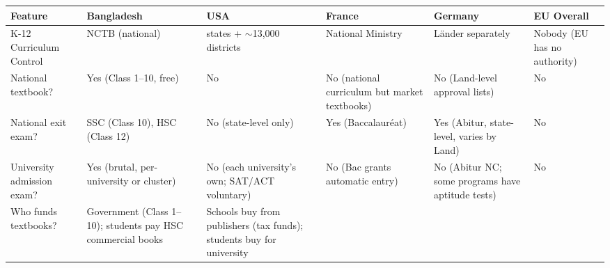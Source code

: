 \begin{center}\footnotesize
	\begin{tabularx}{\textwidth}{@{} >{\raggedright\arraybackslash}p{2.6cm}
		>{\raggedright\arraybackslash}X
		>{\raggedright\arraybackslash}X
		>{\raggedright\arraybackslash}X
		>{\raggedright\arraybackslash}X
		>{\raggedright\arraybackslash}X @{}}
		\toprule
		\textbf{Feature} & \textbf{Bangladesh}                                                      & \textbf{USA} & \textbf{France} & \textbf{Germany} & \textbf{EU Overall} \\
		\midrule
		K-12 Curriculum Control
		                 & NCTB (national)
		                 & 50 states + $\sim$13,000 districts
		                 & National Ministry
		                 & 16 Länder separately
		                 & Nobody (EU has no authority)                                                                                                                       \\
		\addlinespace
		National textbook?
		                 & Yes (Class 1--10, free)
		                 & No
		                 & No (national curriculum but market textbooks)
		                 & No (Land-level approval lists)
		                 & No                                                                                                                                                 \\
		\addlinespace
		National exit exam?
		                 & SSC (Class 10), HSC (Class 12)
		                 & No (state-level only)
		                 & Yes (Baccalauréat)
		                 & Yes (Abitur, state-level, varies by Land)
		                 & No                                                                                                                                                 \\
		\addlinespace
		University admission exam?
		                 & Yes (brutal, per-university or cluster)
		                 & No (each university's own; SAT/ACT voluntary)
		                 & No (Bac grants automatic entry)
		                 & No (Abitur NC; some programs have aptitude tests)
		                 & No                                                                                                                                                 \\
		\addlinespace
		Who funds textbooks?
		                 & Government (Class 1--10); students pay HSC commercial books
		                 & Schools buy from publishers (tax funds); students buy for university

\end{tabularx}
\end{center}
